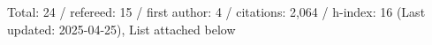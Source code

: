 Total: 24 / refereed: 15 / first author: 4 / citations: 2,064 / h-index: 16 (Last updated: 2025-04-25), List attached below